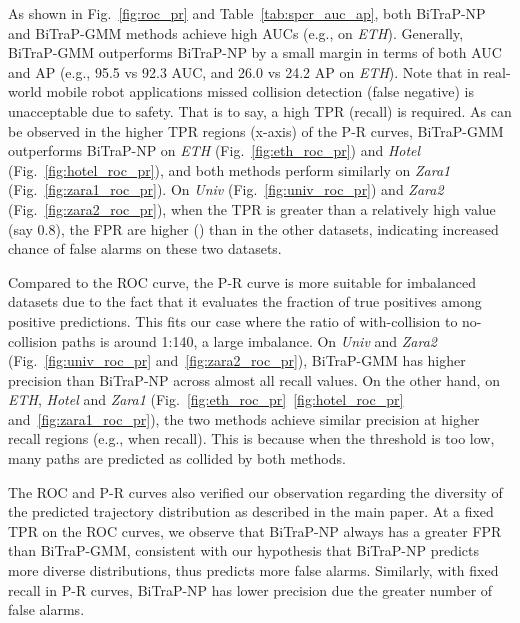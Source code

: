 \documentclass[letterpaper, 10 pt, conference]{ieeeconf}
\begin{document}
As shown in Fig.~\ref{fig:roc_pr} and Table~\ref{tab:spcr_auc_ap}, both BiTraP-NP and BiTraP-GMM methods achieve high AUCs (e.g.,  on \textit{ETH}). Generally, BiTraP-GMM outperforms BiTraP-NP by a small margin in terms of both AUC and AP (e.g., 95.5 vs 92.3 AUC, and 26.0 vs 24.2 AP on \textit{ETH}). Note that in real-world mobile robot applications missed collision detection (false negative) is unacceptable due to safety. That is to say, a high TPR (recall) is required. As can be observed in the higher TPR regions (x-axis) of the P-R curves, BiTraP-GMM outperforms BiTraP-NP on \textit{ETH} (Fig.~\ref{fig:eth_roc_pr}) and \textit{Hotel} (Fig.~\ref{fig:hotel_roc_pr}), and both methods perform similarly on \textit{Zara1} (Fig.~\ref{fig:zara1_roc_pr}). On \textit{Univ} (Fig.~\ref{fig:univ_roc_pr}) and \textit{Zara2} (Fig.~\ref{fig:zara2_roc_pr}), when the TPR is greater than a relatively high value (say 0.8), the FPR are higher  () than in the other datasets, indicating increased chance of false alarms on these two datasets. 

Compared to the ROC curve, the P-R curve is more suitable for imbalanced datasets  due to the fact that it evaluates the fraction of true positives among positive predictions. This fits our case where the ratio of with-collision to no-collision paths is around 1:140, a large imbalance. On \textit{Univ} and \textit{Zara2} (Fig.~\ref{fig:univ_roc_pr} and~\ref{fig:zara2_roc_pr}), BiTraP-GMM has higher precision than BiTraP-NP across almost all recall values. On the other hand, on \textit{ETH}, \textit{Hotel} and \textit{Zara1} (Fig.~\ref{fig:eth_roc_pr}~\ref{fig:hotel_roc_pr} and~\ref{fig:zara1_roc_pr}), the two methods achieve similar precision at higher recall regions (e.g., when recall). This is because when the threshold  is too low, many paths are predicted as collided by both methods. 

The ROC and P-R curves also verified our observation regarding the diversity of the predicted trajectory distribution as described in the main paper. At a fixed TPR on the ROC curves, we observe that BiTraP-NP always has a greater FPR than BiTraP-GMM, consistent with our hypothesis that BiTraP-NP predicts more diverse distributions,  thus predicts more false alarms. Similarly, with fixed recall in P-R curves, BiTraP-NP has lower precision due the greater number of false alarms.
\end{document}
